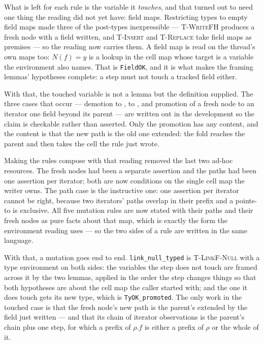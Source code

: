 What is left for each rule is the variable it \emph{touches}, and that turned
out to need one thing the reading did not yet have: field maps.  Restricting
types to empty field maps made three of the post-types inexpressible ---
\textsc{T-WriteFH} produces a fresh node with a field written, and
\textsc{T-Insert} and \textsc{T-Replace} take field maps as premises --- so the
reading now carries them.  A field map is read on the thread's own maps too:
$N(f) = y$ is a lookup in the cell map whose target is a variable the
environment also names.  That is \texttt{FieldOK}, and it is what makes the framing
lemmas' hypotheses complete: a step must not touch a tracked field either.

With that, the touched variable is not a lemma but the definition supplied.  The
three cases that occur --- demotion to \unlk{}, to \frbl{}, and promotion of a
fresh node to an iterator one field beyond its parent --- are written out in the
development so the claim is checkable rather than asserted.  Only the promotion
has any content, and the content is that the new path is the old one extended:
the fold reaches the parent and then takes the cell the rule just wrote.

Making the rules compose with that reading removed the last two ad-hoc
resources.  The fresh nodes had been a separate assertion and the paths had been
one assertion per iterator; both are now conditions on the single cell map the
writer owns.  The path case is the instructive one: one assertion per iterator
cannot be right, because two iterators' paths overlap in their prefix and a
points-to is exclusive.  All five mutation rules are now stated with their paths
and their fresh nodes as pure facts about that map, which is exactly the form
the environment reading uses --- so the two sides of a rule are written in the
same language.

With that, a mutation goes end to end.  \texttt{link\_null\_typed} is
\textsc{T-LinkF-Null} with a type environment on both sides: the variables the
step does not touch are framed across it by the two lemmas, applied in the order
the step changes things so that both hypotheses are about the cell map the
caller started with; and the one it does touch gets its new type, which is
\texttt{TyOK\_promoted}.  The only work in the touched case is that the fresh
node's new path is the parent's extended by the field just written --- and that
its chain of iterator observations is the parent's chain plus one step, for
which a prefix of $\rho.f$ is either a prefix of $\rho$ or the whole of it.


